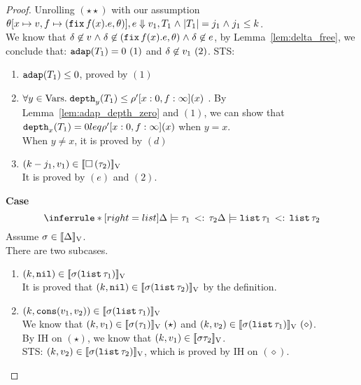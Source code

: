 \begin{proof}
Unrolling $(\star\star)$ with our assumption $ \theta[x \mapsto v, f \mapsto (\mathop{\mathtt{fix}} f(x).e,
\theta)], e \mathrel{\Downarrow} v_1, T_1 \mathrel{\wedge} |T_1| = j_1 \mathrel{\wedge}
j_1 \leq k $. \\ 
We know that $\delta \not\in v \mathrel{\wedge} \delta \not\in  (\mathop{\mathtt{fix}} f(x).e,
\theta) \mathrel{\wedge} \delta \not\in e $, by Lemma~\ref{lem:delta_free}, we
conclude that: $\mathtt{adap}(T_1) =0~(1)$ and  $ \delta \not \in v_1~(2)$.
 STS:
\begin{enumerate}
\item $ \mathtt{adap}(T_1) \leq 0 $, proved by $(1)$ \\  

\item $\forall y \in \mbox{Vars}.\;  \mathtt{depth}_{y}(T_1) \leq
         \rho'[x: 0, f: \infty](x)$ . By
         Lemma~\ref{lem:adap_depth_zero} and $(1)$, we can show that
         $\mathtt{depth}_{x}(T_1) = 0 
leq \rho'[x: 0, f: \infty](x) $ when $y = x$.\\
           When $y \not= x$, it is proved by $(d)$    \\

\item $  (k - j_1,  v_1) \in [\![ \mathtt{\square} \, (\tau_2)  ]\!]_{\text{V}}$
  \\
It is proved by $(e)$ and $(2)$.
\end{enumerate}

\textbf{Case}
 \[
 \inferrule*[right=list]{
      \Delta \models \sub{ \tau_1  }{ \tau_2 } 
    }{
      \Delta \models \sub{ \tlist{\tau_1}  }{ \tlist{\tau_2} }
    }
\]
Assume $ \sigma \in [\![ \Delta ]\!]_{\text{V}}$.\\
There are two subcases. \\
\begin{enumerate}
\item  $ (k, \mathtt{nil} ) \in [\![ \sigma(  \mathtt{list} \, \tau_1 )  ]\!]_{\text{V}}$ \\
       It is proved that $ (k, \mathtt{nil} ) \in [\![ \sigma(
         \mathtt{list} \, \tau_2)   ]\!]_{\text{V}}$ by the definition.\\
\item   $  (k, \mathop{\mathtt{cons}}(v_1,v_2) ) \in [\![ \sigma (
    \mathtt{list} \, \tau_1)  ]\!]_{\text{V}} $ \\
      We know that $ (k, v_1) \in [\![ \sigma (\tau_1) ]\!]_{\text{V}}~(\star) $ and
      $(k, v_2) \in [\![ \sigma (\mathtt{list} \, \tau_1 )  ]\!]_{\text{V}}~(\diamond)$.\\
     By IH on $(\star)$, we know that $(k, v_1) \in
     [\![ \sigma \tau_2 ]\!]_{\text{V}} $.\\
    STS: $(k, v_2) \in [\![ \sigma ( \mathtt{list} \, \tau_2 )  ]\!]_{\text{V}}$, which is
    proved by IH on $(\diamond)$.
\end{enumerate}


\end{proof}
